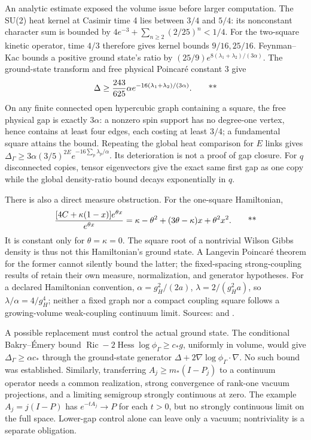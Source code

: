 An analytic estimate exposed the volume issue before larger computation.
The SU(2) heat kernel at Casimir time 4 lies between \(3/4\) and \(5/4\):
its nonconstant character sum is bounded by
\(4e^{-3}+\sum_{n\ge2}(2/25)^n<1/4\).
For the two-square kinetic operator, time \(4/3\) therefore gives kernel
bounds \(9/16,25/16\).  Feynman--Kac bounds a positive ground state's ratio
by \((25/9)e^{8(\lambda_1+\lambda_2)/(3\alpha)}\).  The ground-state transform
and free physical Poincar\'e constant 3 give
\begin{equation}
 \Delta\ge\frac{243}{625}\alpha
 e^{-16(\lambda_1+\lambda_2)/(3\alpha)}.
 \qquad\text{**}\label{early:globalgap}
\end{equation}
On any finite connected open hypercubic graph containing a square, the free
physical gap is exactly \(3\alpha\): a nonzero spin support has no degree-one
vertex, hence contains at least four edges, each costing at least \(3/4\);
a fundamental square attains the bound.  Repeating the global heat comparison
for \(E\) links gives
\(\Delta_\Gamma\ge3\alpha(3/5)^{2E}e^{-16\sum_p\lambda_p/\alpha}\).
Its deterioration is not a proof of gap closure.  For \(q\) disconnected
copies, tensor eigenvectors give the exact same first gap as one copy while
the global density-ratio bound decays exponentially in \(q\).

There is also a direct measure obstruction.  For the one-square Hamiltonian,
\begin{equation}
 \frac{[4C+\kappa(1-x)]e^{\theta x}}{e^{\theta x}}
 =\kappa-\theta^2+(3\theta-\kappa)x+\theta^2x^2.
 \qquad\text{**}\label{early:gibbs}
\end{equation}
It is constant only for \(\theta=\kappa=0\).  The square root of a nontrivial
Wilson Gibbs density is thus not this Hamiltonian's ground state.  A
Langevin Poincar\'e theorem for the former cannot silently bound the latter;
the fixed-spacing strong-coupling results of \cite{shen2022strong} retain their
own measure, normalization, and generator hypotheses.
For a declared Hamiltonian convention,
\(\alpha=g_H^2/(2a)\), \(\lambda=2/(g_H^2a)\), so
\(\lambda/\alpha=4/g_H^4\); neither a fixed graph nor a compact coupling
square follows a growing-volume weak-coupling continuum limit.  Sources:
 and
.

A possible replacement must control the actual ground state.  The conditional
Bakry--\'Emery bound
\(\operatorname{Ric}-2\operatorname{Hess}\log\phi_\Gamma\ge c_*g\), uniformly
in volume, would give \(\Delta_\Gamma\ge\alpha c_*\) through the
ground-state generator \(\Delta+2\nabla\log\phi_\Gamma\cdot\nabla\).
No such bound was established.  Similarly, transferring
\(A_j\ge m_*(I-P_j)\) to a continuum operator needs a common realization,
strong convergence of rank-one vacuum projections, and a limiting semigroup
strongly continuous at zero.  The example \(A_j=j(I-P)\) has
\(e^{-tA_j}\to P\) for each \(t>0\), but no strongly continuous limit on
the full space.  Lower-gap control alone can leave only a vacuum; nontriviality
is a separate obligation.

